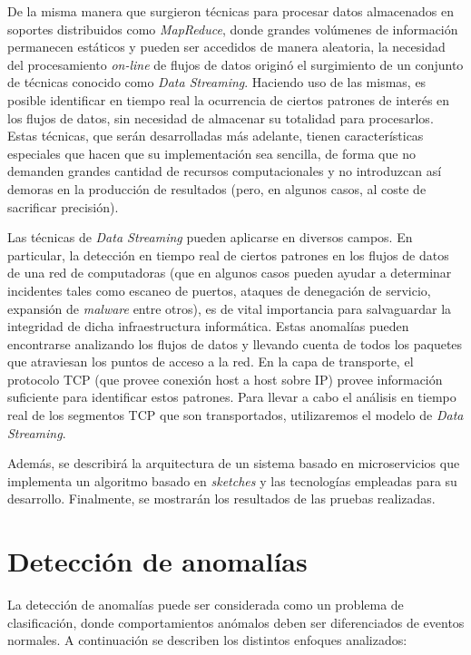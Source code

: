 \documentclass[a4paper,10pt, oneside]{article}
\begin{document}
De la misma manera que surgieron técnicas para procesar datos almacenados en soportes distribuidos como \textit{MapReduce}\cite{Dean:2004:MSD:1251254.1251264}, donde grandes volúmenes de información permanecen estáticos y pueden ser accedidos de manera aleatoria, la necesidad del procesamiento \textit{on-line} de flujos de datos originó el surgimiento de un conjunto de técnicas conocido como \textit{Data Streaming}. Haciendo uso de las mismas, es posible identificar en tiempo real la ocurrencia de ciertos patrones de interés en los flujos de datos, sin necesidad de almacenar su totalidad para procesarlos. Estas técnicas, que serán desarrolladas más adelante, tienen características especiales que hacen que su implementación sea sencilla, de forma que no demanden grandes cantidad de recursos computacionales y no introduzcan así demoras en la producción de resultados (pero, en algunos casos, al coste de sacrificar precisión).

Las técnicas de \textit{Data Streaming} pueden aplicarse en diversos campos. En particular, la detección en tiempo real de ciertos patrones en los flujos de datos de una red de computadoras (que en algunos casos pueden ayudar a determinar incidentes tales como escaneo de puertos, ataques de denegación de servicio, expansión de \textit{malware} entre otros), es de vital importancia para salvaguardar la integridad de dicha infraestructura informática. Estas anomalías pueden encontrarse analizando los flujos de datos y llevando cuenta de todos los paquetes que atraviesan los puntos de acceso a la red. En la capa de transporte, el protocolo TCP (que provee conexión host a host sobre IP) provee información suficiente para identificar estos patrones. Para llevar a cabo el análisis en tiempo real de los segmentos TCP que son transportados, utilizaremos el modelo de \textit{Data Streaming}.

Además, se describirá la arquitectura de un sistema basado en microservicios que implementa un algoritmo basado en \textit{sketches} y las tecnologías empleadas para su desarrollo. Finalmente, se mostrarán los resultados de las pruebas realizadas.

\newpage

\section{Detección de anomalías}
La detección de anomalías puede ser considerada como un problema de clasificación, donde comportamientos anómalos deben ser diferenciados de eventos normales\cite{baddar2014anomaly}. A continuación se describen los distintos enfoques analizados:
\end{document}
